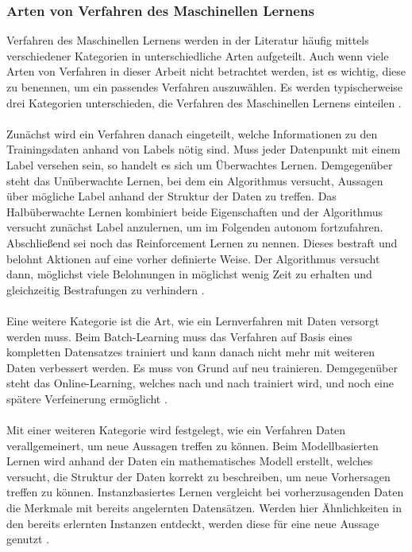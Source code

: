 \documentclass[11pt,bibliography=totocnumbered]{scrartcl}
\begin{document}
\subsubsection{Arten von Verfahren des Maschinellen Lernens}
Verfahren des Maschinellen Lernens werden in der Literatur häufig mittels verschiedener Kategorien in unterschiedliche Arten aufgeteilt. Auch wenn viele Arten von Verfahren in dieser Arbeit nicht betrachtet werden, ist es wichtig, diese zu benennen, um ein passendes Verfahren auszuwählen. Es werden typischerweise drei Kategorien unterschieden, die Verfahren des Maschinellen Lernens einteilen \cite[S.8-14]{MACHINE_LEARNING}\cite[S.2]{BA}. 
\\\\
Zunächst wird ein Verfahren danach eingeteilt, welche Informationen zu den Trainingsdaten anhand von Labels nötig sind. Muss jeder Datenpunkt mit einem Label versehen sein, so handelt es sich um Überwachtes Lernen. Demgegenüber steht das Unüberwachte Lernen, bei dem ein Algorithmus versucht, Aussagen über mögliche Label anhand der Struktur der Daten zu treffen. Das Halbüberwachte Lernen kombiniert beide Eigenschaften und der Algorithmus versucht zunächst Label anzulernen, um im Folgenden autonom fortzufahren. Abschließend sei noch das Reinforcement Lernen zu nennen. Dieses bestraft und belohnt Aktionen auf eine vorher definierte Weise. Der Algorithmus versucht dann, möglichst viele Belohnungen in möglichst wenig Zeit zu erhalten und gleichzeitig Bestrafungen zu verhindern \cite[S.8-14]{MACHINE_LEARNING}\cite[S.2]{BA}.
\\\\
Eine weitere Kategorie ist die Art, wie ein Lernverfahren mit Daten versorgt werden muss. Beim Batch-Learning muss das Verfahren auf Basis eines kompletten Datensatzes trainiert und kann danach nicht mehr mit weiteren Daten verbessert werden. Es muss von Grund auf neu trainieren. Demgegenüber steht das Online-Learning, welches nach und nach trainiert wird, und noch eine spätere Verfeinerung ermöglicht \cite[S.14-17]{MACHINE_LEARNING}\cite[S.2]{BA}.
\\\\
Mit einer weiteren Kategorie wird festgelegt, wie ein Verfahren Daten verallgemeinert, um neue Aussagen treffen zu können. Beim Modellbasierten Lernen wird anhand der Daten ein mathematisches Modell erstellt, welches versucht, die Struktur der Daten korrekt zu beschreiben, um neue Vorhersagen treffen zu können. Instanzbasiertes Lernen vergleicht bei vorherzusagenden Daten die Merkmale mit bereits angelernten Datensätzen. Werden hier Ähnlichkeiten in den bereits erlernten Instanzen entdeckt, werden diese für eine neue Aussage genutzt \cite[S.14-17]{MACHINE_LEARNING}\cite[S.2]{BA}.
\end{document}
